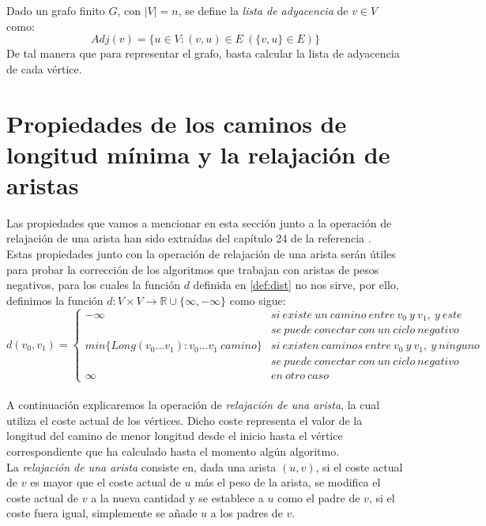 \begin{definicion}
	Dado un grafo finito $G$, con $|V|=n$, se define la \textit{lista de adyacencia} de $v \in V$ como:
	$$Adj(v) = \{u \in V : (v,u)\in E\ (\{v,u\}\in E)\}$$
	De tal manera que para representar el grafo, basta calcular la lista de adyacencia de cada vértice.
\end{definicion}

\section{Propiedades de los caminos de longitud mínima y la relajación de aristas}\label{sec:2.2}

Las propiedades que vamos a mencionar en esta sección junto a la operación de relajación de una arista han sido extraídas del capítulo 24 de la referencia \cite{algorithms}. \\

Estas propiedades junto con la operación de relajación de una arista serán útiles para probar la corrección de los algoritmos que trabajan con aristas de pesos negativos, para los cuales la función $d$ definida en \autoref{def:dist} no nos sirve, por ello, definimos la función $d:V\times V \rightarrow \mathbb{R}\cup \{\infty,-\infty\}$ como sigue:
$$d(v_0,v_1)= \left\{ \begin{array}{lcc}
	-\infty & si\ existe\ un\ camino\ entre\ v_0\ y\ v_1,\ y\ este\\ & se\ puede\ conectar\ con\ un\ ciclo\ negativo
	\\ min\{Long(v_0...v_1) : v_0...v_1\ camino\} &   si\ existen\ caminos\ entre\ v_0\ y\ v_1,\ y\ ninguno\\ & se\ puede\ conectar\ con\ un\ ciclo\ negativo
	\\ \infty &  en\ otro\ caso
\end{array}
\right.$$ \\

A continuación explicaremos la operación de \textit{relajación de una arista}, la cual utiliza el coste actual de los vértices. Dicho coste representa el valor de la longitud del camino de menor longitud desde el inicio hasta el vértice correspondiente que ha calculado hasta el momento algún algoritmo. \\

La \textit{relajación de una arista} consiste en, dada una arista $(u,v)$, si el coste actual de $v$ es mayor que el coste actual de $u$ más el peso de la arista, se modifica el coste actual de $v$ a la nueva cantidad y se establece a $u$ como el padre de $v$, si el coste fuera igual, simplemente se añade $u$ a los padres de $v$. \\

